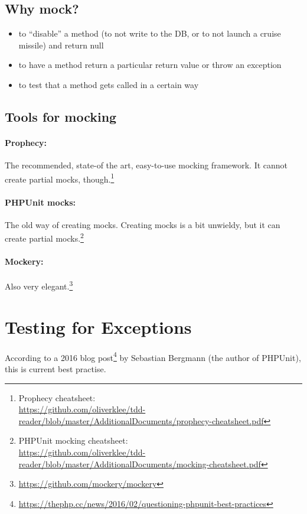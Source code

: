 \documentclass[a4paper,11pt,headsepline]{scrartcl}
\begin{document}
\subsection{Why mock?}
\begin{itemize}
  \item to ``disable'' a method (to not write to the DB, or to not launch a cruise missile) and return null
  \item to have a method return a particular return value or throw an exception
  \item to test that a method gets called in a certain way
\end{itemize}

\subsection{Tools for mocking}

\paragraph{Prophecy:} The recommended, state-of the art, easy-to-use mocking framework. It cannot create partial mocks, though.\footnote{Prophecy cheatsheet:\\ \url{https://github.com/oliverklee/tdd-reader/blob/master/AdditionalDocuments/prophecy-cheatsheet.pdf}}
\paragraph{PHPUnit mocks:} The old way of creating mocks. Creating mocks is a bit unwieldy, but it can create partial mocks.\footnote{PHPUnit mocking cheatsheet:\\ \url{https://github.com/oliverklee/tdd-reader/blob/master/AdditionalDocuments/mocking-cheatsheet.pdf}}
\paragraph{Mockery:} Also very elegant.\footnote{\url{https://github.com/mockery/mockery}}


\pagebreak
\section{Testing for Exceptions}

According to a 2016 blog post\footnote{\url{https://thephp.cc/news/2016/02/questioning-phpunit-best-practices}} by Sebastian Bergmann (the author of PHPUnit), this is current best practise.
\end{document}
